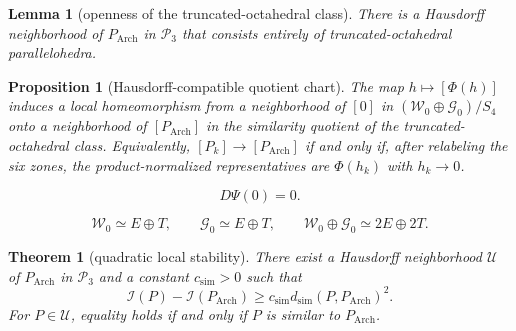 \documentclass[10pt,a4paper]{amsart}
\newtheorem{theorem}{Theorem}
\newtheorem{lemma}{Lemma}
\newtheorem{proposition}{Proposition}
\newcommand{\Arch}{P_{\mathrm{Arch}}}
\newcommand{\Ical}{\mathcal I}
\begin{document}
\begin{lemma}[openness of the truncated-octahedral class]\label{lem:open-class}
There is a Hausdorff neighborhood of $\Arch$ in $\mathcal P_3$ that consists entirely of
truncated-octahedral parallelohedra.
\end{lemma}

\begin{proposition}[Hausdorff-compatible quotient chart]\label{prop:topology}
The map $h\mapsto[\Phi(h)]$ induces a local homeomorphism from a neighborhood of $[0]$ in
$(\mathcal W_0\oplus\mathcal G_0)/S_4$ onto a neighborhood of $[\Arch]$ in the
similarity quotient of the truncated-octahedral class.  Equivalently, $[P_k]\to[\Arch]$
if and only if, after relabeling the six zones, the product-normalized representatives are
$\Phi(h_k)$ with $h_k\to0$.
\end{proposition}

\begin{equation}\label{eq:critical}
 D\Psi(0)=0.
\end{equation}

\begin{equation}\label{eq:decomposition}
 \mathcal W_0\simeq E\oplus T,
 \qquad
 \mathcal G_0\simeq E\oplus T,
 \qquad
 \mathcal W_0\oplus\mathcal G_0\simeq2E\oplus2T.
\end{equation}

\begin{theorem}[quadratic local stability]\label{thm:main}
There exist a Hausdorff neighborhood $\mathcal U$ of $\Arch$ in $\mathcal P_3$ and a constant $c_{\mathrm{sim}}>0$ such that
\begin{equation}\label{eq:intrinsic-stability}
 \Ical(P)-\Ical(\Arch)\geq
 c_{\mathrm{sim}}d_{\mathrm{sim}}(P,\Arch)^2.
\end{equation}
For $P\in\mathcal U$, equality holds if and only if $P$ is similar to $\Arch$. 
\end{theorem}
\end{document}
